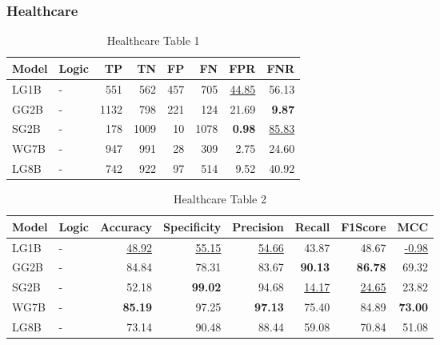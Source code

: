 \documentclass{article}
\begin{document}

\subsubsection{Healthcare}

\begin{table}[H]
\centering
\begin{tabular}{llrrrrrr}
\toprule
 Model          & Logic   &   TP &   TN &   FP &   FN &   FPR &   FNR \\
\midrule

 LG1B    & -       &  551 &  562 &  457 &  705 & \underline{44.85} & 56.13             \\
 GG2B    & -       & 1132 &  798 &  221 &  124 & 21.69             & \textbf{9.87}     \\
 SG2B    & -       &  178 & 1009 &   10 & 1078 & \textbf{0.98}     & \underline{85.83} \\
 WG7B    & -       &  947 &  991 &   28 &  309 & 2.75              & 24.60             \\
 LG8B    & -       &  742 &  922 &   97 &  514 & 9.52              & 40.92             \\

\bottomrule
\end{tabular}
\caption{\label{tab:widgets}Healthcare Table 1}
\end{table}

\begin{table}[H]
\begin{tabular}{llrrrrrr}
\toprule
 Model          & Logic   &   Accuracy &   Specificity &   Precision &   Recall &   F1Score &      MCC \\
\midrule

 LG1B    & -       & \underline{48.92} & \underline{55.15} & \underline{54.66} & 43.87             & 48.67             & \underline{-0.98} \\
 GG2B    & -       & 84.84             & 78.31             & 83.67             & \textbf{90.13}    & \textbf{86.78}    & 69.32             \\
 SG2B    & -       & 52.18             & \textbf{99.02}    & 94.68             & \underline{14.17} & \underline{24.65} & 23.82             \\
 WG7B    & -       & \textbf{85.19}    & 97.25             & \textbf{97.13}    & 75.40             & 84.89             & \textbf{73.00}    \\
 LG8B    & -       & 73.14             & 90.48             & 88.44             & 59.08             & 70.84             & 51.08             \\

\bottomrule
\end{tabular}
\caption{\label{tab:xstest2}Healthcare Table 2}
\end{table}
\end{document}

